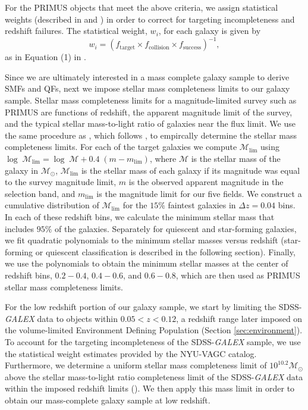 For the PRIMUS objects that meet the above criteria, we assign statistical weights (described in \citealt{Coil:2011aa} and \citealt{Cool:2013aa}) in order to correct for targeting incompleteness and redshift failures. The statistical weight, $w_i$, for each galaxy is given by
\begin{equation}
w_{i} = (f_{\mathrm{target}} \times f_{\mathrm{collision}} \times f_{\mathrm{success}})^{-1},
\end{equation}
as in Equation (1) in \cite{Moustakas:2013aa}. 

Since we are ultimately interested in a mass complete galaxy sample to
derive SMFs and QFs, next we impose stellar mass completeness limits
to our galaxy sample.
Stellar mass completeness limits for a magnitude-limited survey such as PRIMUS are functions of redshift, the apparent magnitude limit of the survey, and the typical stellar mass-to-light ratio of galaxies near the flux limit. We use the same procedure as \cite{Moustakas:2013aa}, which follows \cite{Pozzetti:2010aa}, to empircally determine the stellar mass completeness limits. For each of the target galaxies we compute $\mathcal{M}_{\mathrm{lim}}$ using $\log \; \mathcal{M}_{\mathrm{lim}} = \log \; \mathcal{M} + 0.4\;(m - m_{\mathrm{lim}})$, where $\mathcal{M}$ is the stellar mass of the galaxy in $\mathcal{M_{\odot}}$, $\mathcal{M}_{\mathrm{lim}}$ is the stellar mass of each galaxy if its magnitude was equal to the survey magnitude limit, $m$ is the observed apparent magnitude in the selection band, and $m_{\mathrm{lim}}$ is the magnitude limit for our five fields. We construct a cumulative distribution of $\mathcal{M}_{\mathrm{lim}}$ for the $15\%$ faintest galaxies in $\Delta z=0.04$ bins. In each of these redshift bins, we calculate the minimum stellar mass that includes $95 \%$ of the galaxies. Separately for quiescent and star-forming galaxies, we fit quadratic polynomials to the minimum stellar masses versus redshift (star-forming or quiescent classification is described in the following section). Finally, we use the polynomials to obtain the minimum stellar masses at the center of redshift bins, $0.2-0.4$, $0.4-0.6$, and $0.6-0.8$, which are then used as PRIMUS stellar mass completeness limits.

For the low redshift portion of our galaxy sample, we start by limiting the SDSS-{\em GALEX} data to objects within $0.05 < z < 0.12$, a redshift range later imposed on the volume-limited Environment Defining Population (Section \ref{sec:environment}). To account for the targeting incompleteness of the SDSS-{\em GALEX} sample, we use the statistical weight estimates provided by the NYU-VAGC catalog. Furthermore, we determine a uniform stellar mass completeness limit of $10^{10.2} \mathcal{M}_{\odot}$ above the stellar mass-to-light ratio completeness limit of the SDSS-{\em GALEX} data within the imposed redshift limits (\citealt{Blanton:2005ab, Baldry:2008aa, Moustakas:2013aa}). We then apply this mass limit in order to obtain our mass-complete galaxy sample at low redshift. 

